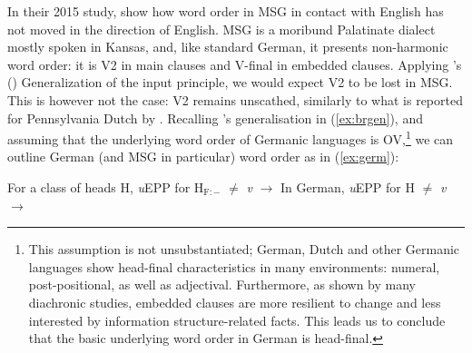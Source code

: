 \documentclass[output=paper]{langscibook}
\begin{document}
In their 2015 study, \citeauthor{HoppPutnam2015} show how word order in MSG in contact with English has not moved in the direction of English. MSG is a moribund Palatinate dialect mostly spoken in Kansas, and, like standard German, it presents non-harmonic word order: it is V2 in main clauses and V-final in embedded clauses. Applying \citeauthor{RobertsHolmberg2010}'s (\citeyear{RobertsHolmberg2010}) Generalization of the input principle, we would expect V2 to be lost in MSG. This is however not the case: V2 remains unscathed, similarly to what is reported for Pennsylvania Dutch by \citet{Fuller1997}. Recalling \citeauthor{RobertsHolmberg2010}'s generalisation in (\ref{ex:brgen}), and assuming that the underlying word order of Germanic languages is OV,\footnote{This assumption is not unsubstantiated; German, Dutch and other Germanic languages show head-final characteristics in many environments: numeral, post-positional, as well as adjectival. Furthermore, as shown by many diachronic studies, embedded clauses are more resilient to change and less interested by information structure-related facts. This leads us to conclude that the basic underlying word order in German is head-final.} we can outline German (and MSG in particular) word order as in (\ref{ex:germ}): %
\begin{exe}
\ex \label{ex:gengerm}\begin{xlist}
\ex \label{ex:brgen} For a class of heads H, \textit{u}EPP for H$_{\textrm{F}:-}$ $\neq$ \textit{v} $\rightarrow$ 
\ex In German, \textit{u}EPP for H $\neq$ \textit{v} $\rightarrow$ \label{ex:germ}
\end{xlist}
\end{exe}
\end{document}
